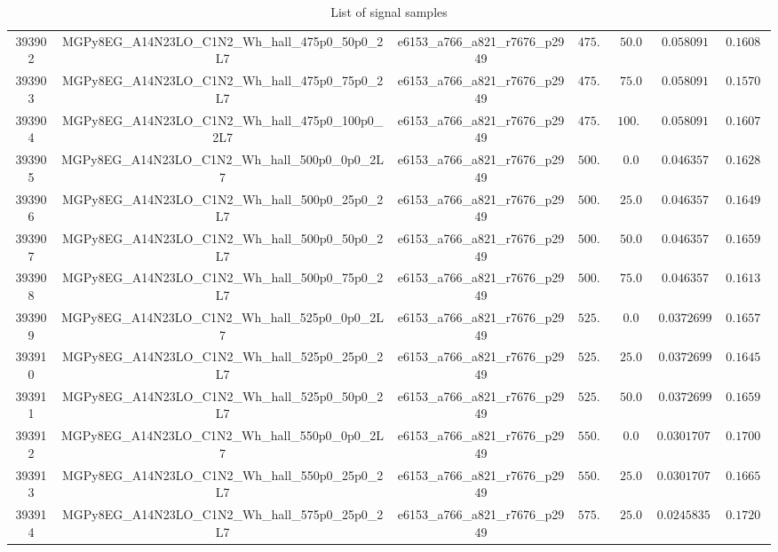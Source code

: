 \begin{table}[htbp]
\begin{center}
{\begin{tabular}{ccccccc}
393902 & MGPy8EG\_A14N23LO\_C1N2\_Wh\_hall\_475p0\_50p0\_2L7  & e6153\_a766\_a821\_r7676\_p2949 & $475.0$ & $50.0 $ & $0.058091  $ & $0.16086$ \\
393903 & MGPy8EG\_A14N23LO\_C1N2\_Wh\_hall\_475p0\_75p0\_2L7  & e6153\_a766\_a821\_r7676\_p2949 & $475.0$ & $75.0 $ & $0.058091  $ & $0.15701$ \\
393904 & MGPy8EG\_A14N23LO\_C1N2\_Wh\_hall\_475p0\_100p0\_2L7 & e6153\_a766\_a821\_r7676\_p2949 & $475.0$ & $100.0$ & $0.058091  $ & $0.16078$ \\
393905 & MGPy8EG\_A14N23LO\_C1N2\_Wh\_hall\_500p0\_0p0\_2L7   & e6153\_a766\_a821\_r7676\_p2949 & $500.0$ & $0.0  $ & $0.046357  $ & $0.16288$ \\
393906 & MGPy8EG\_A14N23LO\_C1N2\_Wh\_hall\_500p0\_25p0\_2L7  & e6153\_a766\_a821\_r7676\_p2949 & $500.0$ & $25.0 $ & $0.046357  $ & $0.16494$ \\
393907 & MGPy8EG\_A14N23LO\_C1N2\_Wh\_hall\_500p0\_50p0\_2L7  & e6153\_a766\_a821\_r7676\_p2949 & $500.0$ & $50.0 $ & $0.046357  $ & $0.16591$ \\
393908 & MGPy8EG\_A14N23LO\_C1N2\_Wh\_hall\_500p0\_75p0\_2L7  & e6153\_a766\_a821\_r7676\_p2949 & $500.0$ & $75.0 $ & $0.046357  $ & $0.16130$ \\
393909 & MGPy8EG\_A14N23LO\_C1N2\_Wh\_hall\_525p0\_0p0\_2L7   & e6153\_a766\_a821\_r7676\_p2949 & $525.0$ & $0.0  $ & $0.0372699 $ & $0.16579$ \\
393910 & MGPy8EG\_A14N23LO\_C1N2\_Wh\_hall\_525p0\_25p0\_2L7  & e6153\_a766\_a821\_r7676\_p2949 & $525.0$ & $25.0 $ & $0.0372699 $ & $0.16455$ \\
393911 & MGPy8EG\_A14N23LO\_C1N2\_Wh\_hall\_525p0\_50p0\_2L7  & e6153\_a766\_a821\_r7676\_p2949 & $525.0$ & $50.0 $ & $0.0372699 $ & $0.16592$ \\
393912 & MGPy8EG\_A14N23LO\_C1N2\_Wh\_hall\_550p0\_0p0\_2L7   & e6153\_a766\_a821\_r7676\_p2949 & $550.0$ & $0.0  $ & $0.03017074$ & $0.17007$ \\
393913 & MGPy8EG\_A14N23LO\_C1N2\_Wh\_hall\_550p0\_25p0\_2L7  & e6153\_a766\_a821\_r7676\_p2949 & $550.0$ & $25.0 $ & $0.03017074$ & $0.16650$ \\
393914 & MGPy8EG\_A14N23LO\_C1N2\_Wh\_hall\_575p0\_25p0\_2L7  & e6153\_a766\_a821\_r7676\_p2949 & $575.0$ & $25.0 $ & $0.02458351$ & $0.17201$ \\
\hline
\end{tabular}}
\end{center}
\caption{List of signal samples}
\label{table:signal}
\end{table}
